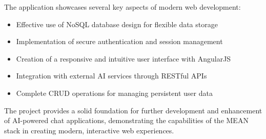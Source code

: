 \documentclass[12pt,a4paper]{article}
\begin{document}
The application showcases several key aspects of modern web development:
\begin{itemize}
\item Effective use of NoSQL database design for flexible data storage
\item Implementation of secure authentication and session management
\item Creation of a responsive and intuitive user interface with AngularJS
\item Integration with external AI services through RESTful APIs
\item Complete CRUD operations for managing persistent user data
\end{itemize}

The project provides a solid foundation for further development and enhancement of AI-powered chat applications, demonstrating the capabilities of the MEAN stack in creating modern, interactive web experiences.
\end{document}
